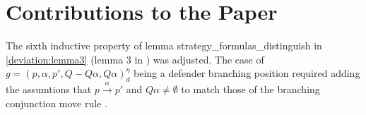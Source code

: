 \section{Contributions to the Paper}
The sixth inductive property of lemma strategy\_formulas\_distinguish in \ref{deviation:lemma3} (lemma 3 in \cite{bisping2023lineartimebranchingtime}) was adjusted. The case of $g=(p,\alpha ,p', Q- Q \alpha, Q \alpha)_d^\eta$ being a defender branching position required adding the assumtions that $p \overset{\alpha}{\longrightarrow} p'$ and $Q \alpha \neq \emptyset$ to match those of the branching conjunction move rule \cite[cf. p. 13]{bisping2023lineartimebranchingtime}. 